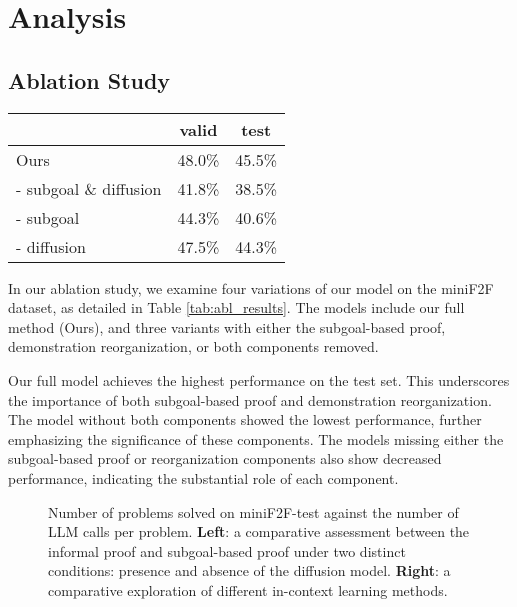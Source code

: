 \documentclass{article}
\begin{document}
\section{Analysis}
\label{sec:analysis}


\subsection{Ablation Study}
\label{sec:analysis_abl}


\begin{table*}[t!]
\centering
\vspace{-2mm}
\caption{Ablation results on the miniF2F dataset with Isabelle. Numbers with a  correspond to the cumulative pass rate.}
\label{tab:abl_results}
\begin{tabular}{lcc}
\toprule
\multicolumn{1}{c}{\textbf{}}    & valid & test \\ \midrule
Ours                             & 48.0\%        & 45.5\%       \\ \midrule
- subgoal \& diffusion & 41.8\%        & 38.5\%       \\
- subgoal               & 44.3\%        & 40.6\%       \\
- diffusion             & 47.5\%        & 44.3\%      \\ \bottomrule
\end{tabular}
\end{table*}

In our ablation study, we examine four variations of our model on the miniF2F dataset, as detailed in Table \ref{tab:abl_results}. The models include our full method (Ours), and three variants with either the subgoal-based proof, demonstration reorganization, or both components removed.

Our full model achieves the highest performance on the test set. This underscores the importance of both subgoal-based proof and demonstration reorganization. The model without both components showed the lowest performance, further emphasizing the significance of these components. The models missing either the subgoal-based proof or reorganization components also show decreased performance, indicating the substantial role of each component.


\begin{figure}[t!]
\centering
{}
\vspace{-2mm}
\caption{Number of problems solved on miniF2F-test against the number of LLM calls per problem. \textbf{Left}: a comparative assessment between the informal proof and subgoal-based proof under two distinct conditions: presence and absence of the diffusion model. \textbf{Right}: a comparative exploration of different in-context learning methods.}
\end{figure}
\end{document}
